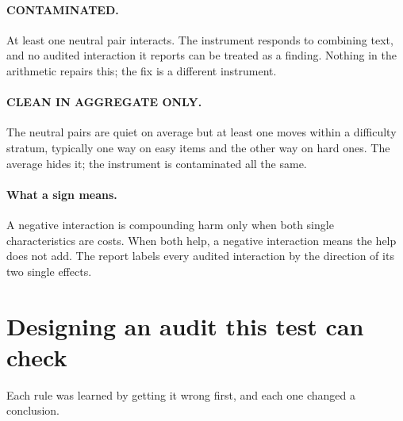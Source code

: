 \documentclass[11pt]{article}
\begin{document}
\paragraph{CONTAMINATED.} At least one neutral pair interacts. The instrument
responds to combining text, and no audited interaction it reports can be treated
as a finding. Nothing in the arithmetic repairs this; the fix is a different
instrument.

\paragraph{CLEAN IN AGGREGATE ONLY.} The neutral pairs are quiet on average but
at least one moves within a difficulty stratum, typically one way on easy items
and the other way on hard ones. The average hides it; the instrument is
contaminated all the same.

\paragraph{What a sign means.} A negative interaction is compounding harm only
when both single characteristics are costs. When both help, a negative
interaction means the help does not add. The report labels every audited
interaction by the direction of its two single effects.

\section*{Designing an audit this test can check}

Each rule was learned by getting it wrong first, and each one changed a
conclusion.
\end{document}
